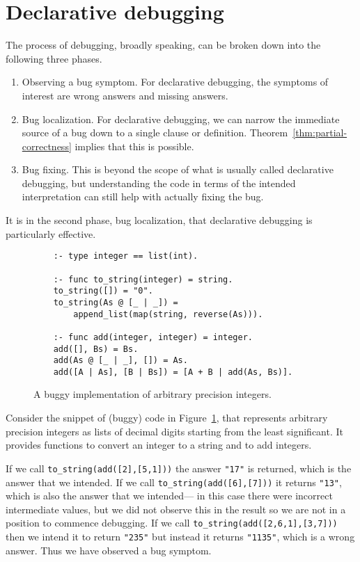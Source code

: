 \section{Declarative debugging}
\label{sec:decl-debug}

The process of debugging, broadly speaking,
can be broken down into the following three phases.
\begin{enumerate}
\item
Observing a bug symptom.
For declarative debugging,
the symptoms of interest are wrong answers and missing answers.
\item
Bug localization.
For declarative debugging,
we can narrow the immediate source of a bug
down to a single clause or definition.
Theorem~\ref{thm:partial-correctness} implies that this is possible.
\item
Bug fixing.
This is beyond the scope of what is usually called declarative debugging,
but understanding the code in terms of the intended interpretation
can still help with actually fixing the bug.
\end{enumerate}
It is in the second phase, bug localization,
that declarative debugging is particularly effective.

\begin{figure}
\begin{verbatim}
    :- type integer == list(int).

    :- func to_string(integer) = string.
    to_string([]) = "0".
    to_string(As @ [_ | _]) =
        append_list(map(string, reverse(As))).

    :- func add(integer, integer) = integer.
    add([], Bs) = Bs.
    add(As @ [_ | _], []) = As.
    add([A | As], [B | Bs]) = [A + B | add(As, Bs)].
\end{verbatim}
\caption{A buggy implementation of arbitrary precision integers.
\label{fig:buggy-ints}}
\end{figure}

Consider the snippet of (buggy) code in Figure~\ref{fig:buggy-ints},
that represents arbitrary precision integers
as lists of decimal digits
starting from the least significant.
It provides functions
to convert an integer to a string
and to add integers.

If we call \texttt{to\_string(add([2],[5,1]))}
the answer \texttt{"17"} is returned,
which is the answer that we intended.
If we call \texttt{to\_string(add([6],[7]))}
it returns \texttt{"13"},
which is also the answer that we intended---%
in this case there were incorrect intermediate values,
but we did not observe this in the result
so we are not in a position to commence debugging.
If we call \texttt{to\_string(add([2,6,1],[3,7]))}
then we intend it to return \texttt{"235"}
but instead it returns \texttt{"1135"},
which is a wrong answer.
Thus we have observed a bug symptom.

